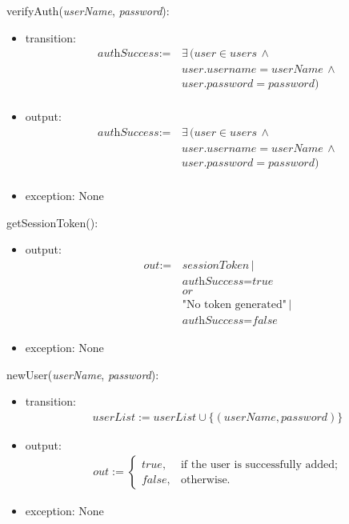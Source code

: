 \documentclass[12pt, titlepage]{article}
\begin{document}
\noindent verifyAuth(\textit{userName}, \textit{password}):
\begin{itemize}
\item transition: 
\begin{align*}
\textit{authSuccess} := &\, \exists \, (\textit{user} \in \textit{users} \, \land \\
&\, \textit{user.username} = \textit{userName} \, \land \\
&\, \textit{user.password} = \textit{password}) \\
\end{align*}
\item output: 
\begin{align*}
\textit{authSuccess} := &\, \exists \, (\textit{user} \in \textit{users} \, \land \\
&\, \textit{user.username} = \textit{userName} \, \land \\
&\, \textit{user.password} = \textit{password}) \\
\end{align*}

\item exception: None
\end{itemize}

\noindent getSessionToken():
\begin{itemize}
\item output: 
\begin{align*}
\textit{out} := &\, \textit{sessionToken} \, | \\
&\, \textit{authSuccess} = \textit{true} \\
&\, \textit{or} \\
&\, \text{"No token generated"} \, | \\
&\, \textit{authSuccess} = \textit{false}
\end{align*}

\item exception: None
\end{itemize}
\noindent newUser(\textit{userName}, \textit{password}):
\begin{itemize}
\item transition: 
\begin{align*}
userList := userList \cup \{(userName, password)\}
\end{align*}

\item output: 
\begin{align*}
out := \begin{cases}
true, & \text{if the user is successfully added;} \\
false, & \text{otherwise.}
\end{cases}
\end{align*}


\item exception: None
\end{itemize}
\end{document}
